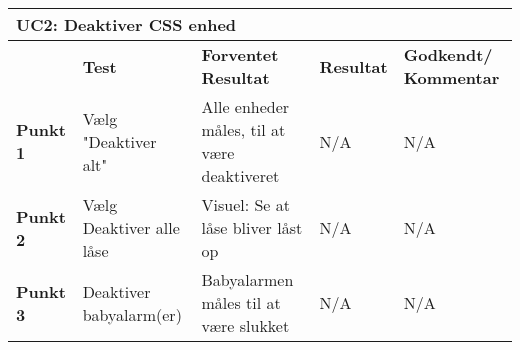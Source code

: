 \begin{table}[htbp] \centering
\begin{tabular}{|p{}|p{}|p{3cm}|p{3cm}|p{3cm}|} %
	\hline
\multicolumn{5}{|l|}{\textbf{UC2: Deaktiver CSS enhed}} \\\hline
&\textbf{Test} &\textbf{Forventet \newline Resultat} &\textbf{Resultat} &\textbf{Godkendt/ \newline Kommentar} \\\hline
\textbf{Punkt 1}	&
Vælg "Deaktiver alt" &
Alle enheder måles, til at være deaktiveret &
N/A &
N/A \\\hline
\textbf{Punkt 2} &
Vælg Deaktiver alle låse &
Visuel: Se at låse bliver låst op &
N/A	&
N/A \\\hline
\textbf{Punkt 3} &
Deaktiver \newline babyalarm(er) &
Babyalarmen måles til at være slukket &
N/A &
N/A \\\hline
	\end{tabular}
	\label{ATUC2} 
\end{table}